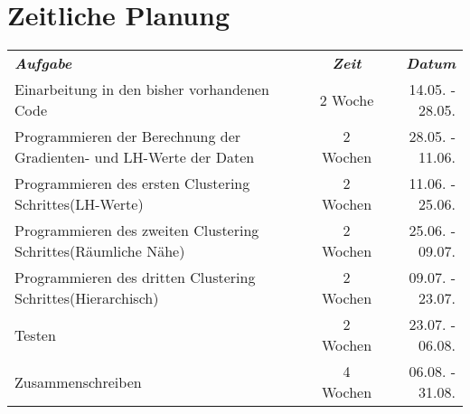 \documentclass{article}
\begin{document}
\section{Zeitliche Planung}

\begin{tabular}{lcr}


\textit{\textbf{Aufgabe}} & \textit{\textbf{Zeit}} & \textit{\textbf{Datum}} \\
 Einarbeitung in den bisher vorhandenen Code & 2 Woche & 14.05. - 28.05. \\
 Programmieren der Berechnung der Gradienten- und LH-Werte der Daten & 2 Wochen & 28.05. - 11.06. \\
 Programmieren des ersten Clustering Schrittes(LH-Werte) & 2 Wochen & 11.06. - 25.06. \\
 Programmieren des zweiten Clustering Schrittes(Räumliche Nähe) & 2 Wochen &  25.06. - 09.07.\\
 Programmieren des dritten Clustering Schrittes(Hierarchisch) & 2 Wochen &  09.07. - 23.07.\\
 Testen  &  2 Wochen & 23.07. - 06.08.\\
 Zusammenschreiben & 4 Wochen &  06.08. - 31.08.\\
 \end{tabular}



\clearpage
{}

\nocite{*}
\end{document}
